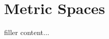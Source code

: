 \documentclass[../../templates/section]{subfiles}
\begin{document}
\section{Metric Spaces}\label{sec:metric-spaces}

filler content...
\end{document}
